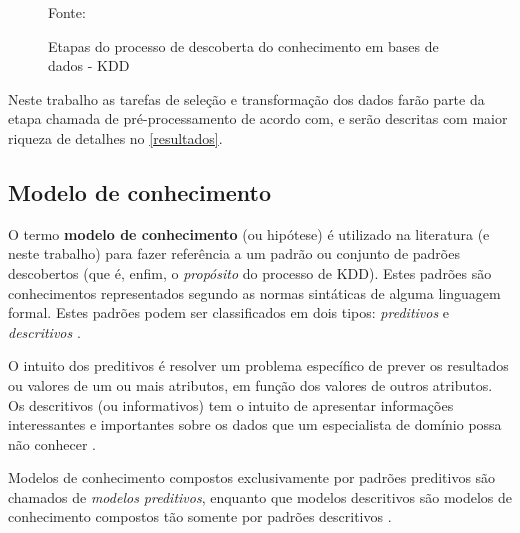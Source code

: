 \begin{figure}[h!]
	\centering
	\caption{Etapas do processo de descoberta do conhecimento em bases de dados - KDD}
	
	{\scriptsize Fonte: }
	\label{fig:processo-KDD}
\end{figure}

Neste trabalho as tarefas de seleção e transformação dos dados farão parte da etapa chamada de pré-processamento de acordo com,  e serão descritas com maior riqueza de detalhes no \autoref{resultados}.

\subsection{Modelo de conhecimento}\label{modelo_conhecimento}
O termo \textbf{modelo de conhecimento} (ou hipótese) é utilizado na literatura (e neste trabalho) para fazer referência a um padrão ou conjunto de padrões descobertos (que é, enfim, o \textit{propósito} do processo de KDD). Estes padrões são conhecimentos representados segundo as normas sintáticas de alguma linguagem formal. Estes padrões podem ser classificados em dois tipos: \textit{preditivos} e \textit{descritivos} \cite{ferrari2017}.

O intuito dos preditivos é resolver um problema específico de prever os resultados ou valores de um ou mais atributos, em função dos valores de outros atributos. Os descritivos (ou informativos) tem o intuito de apresentar informações interessantes e importantes sobre os dados que um especialista de domínio possa não conhecer \cite{goldschmidt2005}. 

Modelos de conhecimento compostos exclusivamente por padrões preditivos são chamados de \textit{modelos preditivos}, enquanto que modelos descritivos são modelos de conhecimento compostos tão somente por padrões descritivos \cite{Boscarioli2017}.

